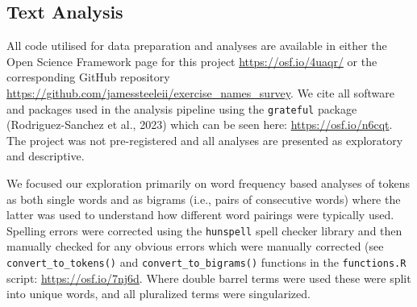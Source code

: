\documentclass[
]{article}
\begin{document}
\subsection{Text Analysis}\label{text-analysis}

All code utilised for data preparation and analyses are available in
either the Open Science Framework page for this project
\url{https://osf.io/4uaqr/} or the corresponding GitHub repository
\url{https://github.com/jamessteeleii/exercise_names_survey}. We cite
all software and packages used in the analysis pipeline using the
\texttt{grateful} package ({Rodriguez-Sanchez et al.}, 2023) which can
be seen here: \url{https://osf.io/n6cqt}. The project was not
pre-registered and all analyses are presented as exploratory and
descriptive.

We focused our exploration primarily on word frequency based analyses of
tokens as both single words and as bigrams (i.e., pairs of consecutive
words) where the latter was used to understand how different word
pairings were typically used. Spelling errors were corrected using the
\texttt{hunspell} spell checker library and then manually checked for
any obvious errors which were manually corrected (see
\texttt{convert\_to\_tokens()} and \texttt{convert\_to\_bigrams()}
functions in the \texttt{functions.R} script:
\url{https://osf.io/7nj6d}. Where double barrel terms were used these
were split into unique words, and all pluralized terms were
singularized.
\end{document}
